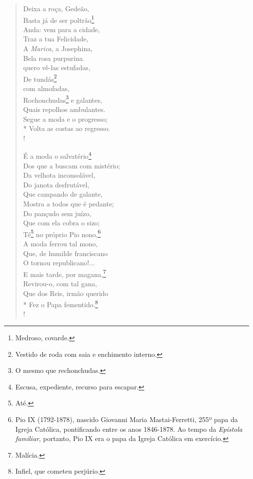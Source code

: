 \begin{verse}
Deixa a roça, Gedeão,\\
Basta já de ser poltrão\footnote{ Medroso, covarde.}\\
Anda: vem para a cidade,\\
Traz a tua Felicidade,\\
A \emph{Marica}, a Josephina,\\
Bela rosa purpurina.\\
quero vê-las estufadas,\\
De tundás\footnote{ Vestido de roda com saia e enchimento interno.}\\
com almofadas,\\
Rochonchudas\footnote{ O mesmo que rechonchudas.} e galantes,\\
Quais repolhos ambulantes.\\
Segue a moda e o progresso;\\*
Volta as costas ao regresso.\\!

É a moda o salvatério\footnote{ Escusa, expediente, recurso para escapar.}\\
Dos que a buscam com mistério;\\
Da velhota inconsolável,\\
Do janota desfrutável,\\
Que campando de galante,\\
Mostra a todos que é pedante;\\
Do pançudo sem juízo,\\
Que com ela cobra o sizo;\\
Té\footnote{ Até.} no próprio Pio nono,\footnote{ Pio IX (1792-1878), 
                      nascido Giovanni Maria Mastai-Ferretti, 255º papa da
                      Igreja Católica, pontificando entre os anos 1846-1878. Ao tempo da
                      \emph{Epístola familiar}, portanto, Pio IX era o papa da Igreja
                      Católica em exercício.}\\
A moda ferrou tal mono,\\
Que, de humilde franciscano\\
O tornou republicano!...\\
E mais tarde, por magana,\footnote{ Malícia.}\\
Revirou-o, com tal gana,\\
Que dos Reis, irmão querido\\*
Fez o Papa fementido.\footnote{ Infiel, que cometeu perjúrio.}\\!


\end{verse}
